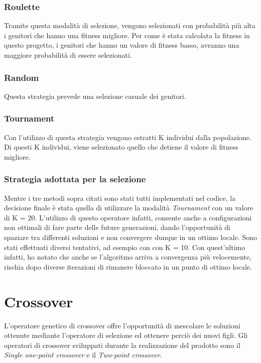 \documentclass[12pt]{article}
\begin{document}
\begin{enumerate}
\subsubsection{Roulette}

Tramite questa modalità di selezione, vengono selezionati con probabilità più alta i genitori che hanno una fitness migliore. Per come è stata calcolata la fitness in questo progetto, i genitori che hanno un valore di fitness basso, avranno una maggiore probabilità di essere selezionati.

\subsubsection{Random}
Questa strategia prevede una selezione casuale dei genitori. 

\subsubsection{Tournament}
Con l'utilizzo di questa strategia vengono estratti K individui dalla popolazione. Di questi K individui, viene selezionato quello che detiene il valore di fitness migliore.

\subsubsection{Strategia adottata per la selezione}
Mentre i tre metodi sopra citati sono stati tutti implementati nel codice, la decisione finale è stata quella di utilizzare la modalità \textit{Tournament} con un valore di K = 20. L'utilizzo di questo operatore infatti, consente anche a configurazioni non ottimali di fare parte delle future generazioni, dando l'opportunità di spaziare tra differenti soluzioni e non convergere dunque in un ottimo locale. Sono stati effettuati diversi tentativi, ad esempio con con K = 10. Con quest'ultimo infatti, ho notato che anche se l'algoritmo arriva a convergenza più velocemente, rischia dopo diverse iterazioni di rimanere bloccato in un punto di ottimo locale.

\section{Crossover}
L'operatore genetico di crossover offre l'opportunità di mescolare le soluzioni ottenute mediante l'operatore di selezione ed ottenere perciò dei nuovi figli. Gli operatori di crossover sviluppati durante la realizzazione del prodotto sono il \textit{Single one-point crossover} e il \textit{Two-point crossover}.


\end{enumerate}
\end{document}
